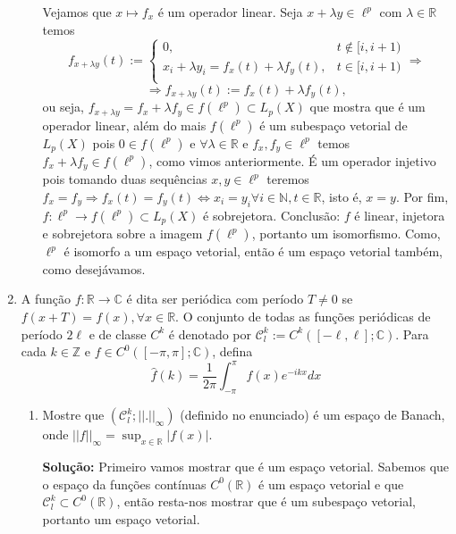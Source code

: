 \documentclass{article}
\begin{document}
\begin{enumerate}
\begin{enumerate}
				Vejamos que $x \mapsto f_{x}$ é um operador linear. Seja $x + \lambda y \in \ell^{p}$ com $\lambda \in \mathbb{R}$ temos
				$$
				f_{x + \lambda y }(t) := \left\{
				\begin{array}{cc}
				0, & t \notin [i, i+1)\\
				x_{i} +\lambda y_{i} = f_{x}(t) + \lambda f_{y}(t), & t \in [i, i+1) \\
				\end{array}
				\right. \Rightarrow				
				$$
				$$
				\Rightarrow f_{x + \lambda y }(t) := f_{x}(t) + \lambda f_{y}(t),
				$$
				ou seja, $f_{x + \lambda y } = f_{x} + \lambda f_{y } \in f(\ell^{p}) \subset L_{p}(X)$ que mostra que é um operador linear, além do mais $f(\ell^{p})$ é um subespaço vetorial de $L_{p}(X)$ pois $0 \in f(\ell^{p})$ e $\forall \lambda \in \mathbb{R}$ e $f_{x}, f_{y} \in \ell^{p}$ temos $f_{x} + \lambda f_{y } \in f(\ell^{p})$, como vimos anteriormente. É um operador injetivo pois tomando duas sequências $x, y \in \ell^{p}$ teremos $f_{x} = f_{y} \Rightarrow f_{x}(t) = f_{y}(t) \iff x_{i} = y_{i} \forall i \in \mathbb{N}, t \in \mathbb{R}$, isto é, $x=y$. Por fim, $f: \ell^{p} \to f(\ell^{p}) \subset L_{p}(X)$ é sobrejetora. Conclusão: $f$ é linear, injetora e sobrejetora sobre a imagem $f(\ell^{p})$, portanto um isomorfismo. Como, $\ell^{p}$ é isomorfo a um espaço vetorial, então é um espaço vetorial também, como desejávamos.
				
				
				
				
		\end{enumerate}
		
		
		\item A função $f:\mathbb{R} \to \mathbb{C}$ é dita ser periódica com período $T \neq 0$ se $f(x+T) = f(x), \forall x \in \mathbb{R} $. O conjunto de todas as funções periódicas de período $2\ell$ e de classe $C^{k}$ é denotado por $\mathcal{C}^{k}_{l}:=C^{k}([-\ell, \ell]; \mathbb{C})$. Para cada $k \in \mathbb{Z}$ e $f \in C^{0}([-\pi, \pi]; \mathbb{C})$, defina
		$$
		\hat{f}(k) = \frac{1}{2\pi}\int_{-\pi}^{\pi} f(x)e^{-ikx}dx
		$$
		
		\begin{enumerate}
			\item Mostre que $(\mathcal{C}^{k}_{l}; ||.||_{\infty})$ (definido no enunciado) é um espaço de Banach, onde $||f||_{\infty} = \sup_{x \in \mathbb{R}}|f(x)|$.
			
			\textbf{Solução:} Primeiro vamos mostrar que é um espaço vetorial. Sabemos que o espaço da funções contínuas $C^{0}(\mathbb{R})$ é um espaço vetorial e que $\mathcal{C}^{k}_{l} \subset C^{0}(\mathbb{R})$, então resta-nos mostrar que é um subespaço vetorial, portanto um espaço vetorial.
			

\end{enumerate}
\end{enumerate}
\end{document}
